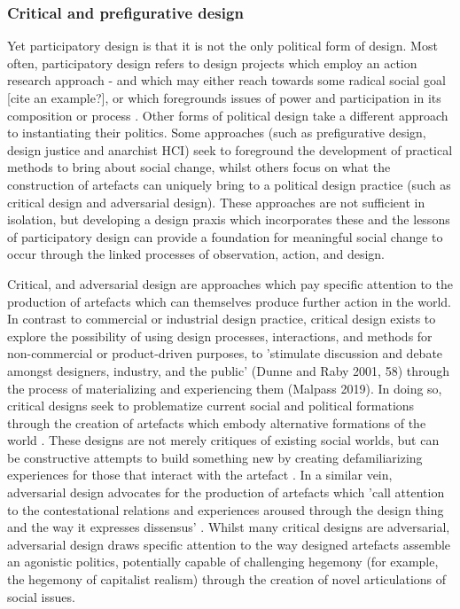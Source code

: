 \subsubsection{Critical and prefigurative design}

Yet participatory design is that it is not the only political form of design. Most often, participatory design refers to design projects which employ an action research approach - and which may either reach towards some radical social goal [cite an example?], or which foregrounds issues of power and participation in its composition or process \cite{vines_configuring_2013}. Other forms of political design take a different approach to instantiating their politics. Some approaches (such as prefigurative design, design justice and anarchist HCI) seek to foreground the development of practical methods to bring about social change, whilst others focus on what the construction of artefacts can uniquely bring to a political design practice (such as critical design and adversarial design).  These approaches are not sufficient in isolation, but developing a design praxis which incorporates these and the lessons of participatory design can provide a foundation for meaningful social change to occur through the linked processes of observation, action, and design.   

Critical, and adversarial design are approaches which pay specific attention to the production of artefacts which can themselves produce further action in the world. In contrast to commercial or industrial design practice, critical design exists to explore the possibility of using design processes, interactions, and methods for non-commercial or product-driven purposes, to 'stimulate discussion and debate amongst designers, industry, and the public' (Dunne and Raby 2001, 58) through the process of materializing and experiencing them (Malpass 2019). In doing so, critical designs seek to problematize current social and political formations through the creation of artefacts which embody alternative formations of the world \cite{bardzell_reading_2014}. These designs are not merely critiques of existing social worlds, but can be constructive attempts to build something new by creating defamiliarizing experiences for those that interact with the artefact \cite{blythe_imaginary_2018}. In a similar vein, adversarial design advocates for the production of artefacts which 'call attention to the contestational relations and experiences aroused through the design thing and the way it expresses dissensus' \cite{disalvo_adversarial_2012}. Whilst many critical designs are adversarial, adversarial design draws specific attention to the way designed artefacts assemble an agonistic politics, potentially capable of challenging hegemony (for example, the hegemony of capitalist realism) through the creation of novel articulations of social issues. 

